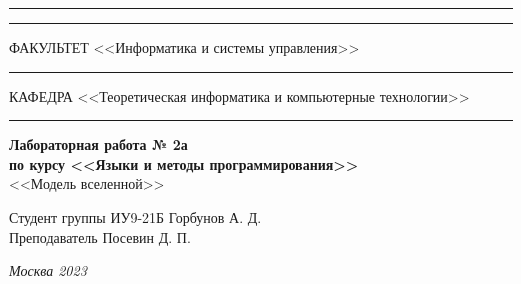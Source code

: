 \documentclass[a4paper, 14pt]{extarticle}
\begin{document}
\begin{titlepage}
\vspace{-25pt}
\hspace{-35pt}\rule{\textwidth}{2.3pt}

\vspace*{-20.3pt}
\hspace{-35pt}\rule{\textwidth}{0.4pt}

\vspace{1.5ex}
\hspace{-35pt} \noindent \small ФАКУЛЬТЕТ\hspace{80pt} <<Информатика и системы управления>>

\vspace*{-16pt}
\hspace{47pt}\rule{0.83\textwidth}{0.4pt}

\vspace{0.5ex}
\hspace{-35pt} \noindent \small КАФЕДРА\hspace{50pt} <<Теоретическая информатика и компьютерные технологии>>

\vspace*{-16pt}
\hspace{30pt}\rule{0.866\textwidth}{0.4pt}
  
\vspace{11em}

\begin{center}
\Large {\bf Лабораторная работа № 2а} \\ 
\large {\bf по курсу <<Языки и методы программирования>>} \\
\large <<Модель вселенной>> 
\end{center}\normalsize

\vspace{8em}


\begin{flushright}
  {Студент группы ИУ9-21Б Горбунов А. Д. \hspace*{15pt}\\ 
  \vspace{2ex}
  Преподаватель Посевин Д. П.\hspace*{15pt}}
\end{flushright}

\bigskip

\vfill
 

\begin{center}
\textsl{Москва 2023}
\end{center}
\end{titlepage}
\end{document}

